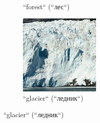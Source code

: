 \begin{figure}[htbp]
\begin{subfigure}[b]{0.3\textwidth}
    \caption{``forest`` (``лес``)}
    \label{fig:intel-multiclass-forest}
  \end{subfigure}
  \hfill
  \begin{subfigure}[b]{0.3\textwidth}
    \centering
    \includegraphics[width=\textwidth]{images/research/dataset/glacier.jpg}
    \caption{``glacier`` (``ледник``)}
    \label{fig:intel-multiclass-glacier}
  \end{subfigure}

  \bigskip %


\end{figure}
